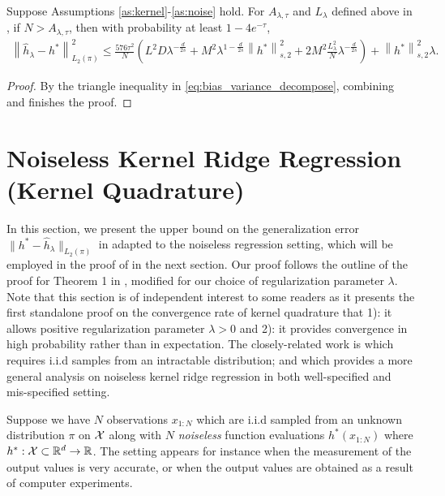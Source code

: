 \begin{prop}\label{prop:krr_all}
Suppose Assumptions \ref{as:kernel}-\ref{as:noise} hold. For $A_{\lambda, \tau}$ and $L_\lambda$ defined above in , if $N > A_{\lambda, \tau}$, then with probability at least $1 - 4e^{-\tau}$,
\begin{align*}
    \left\| \hat{h}_\lambda - h^\ast \right\|_{L_2(\pi)}^2 \leq \frac{576 \tau^2}{N} \left( L^2 D \lambda^{ -\frac{d}{2s} } + M^2 \lambda^{1 - \frac{d}{2s}} \left\| h^\ast \right \|_{s,2}^2  + 2 M^2  \frac{L_\lambda^2}{N} \lambda^{-\frac{d}{2s}} \right) + \left\|h^\ast\right\|_{s,2}^2 \lambda .
\end{align*}
\end{prop}
\begin{proof}
By the triangle inequality in \eqref{eq:bias_variance_decompose}, combining  and  finishes the proof.
\end{proof}

\section{Noiseless Kernel Ridge Regression (Kernel Quadrature)}\label{sec:noiseless_krr}
In this section, we present the upper bound on the generalization error $\| h^\ast - \hat{h}_{\lambda} \|_{L_2(\pi)}$ in  adapted to the noiseless regression setting, which will be employed in the proof of  in the next section.
Our proof follows the outline of the proof for Theorem 1 in \cite{fischer2020sobolev}, modified for our choice of regularization parameter $\lambda$.
Note that this section is of independent interest to some readers as it presents the first standalone proof on the convergence rate of kernel quadrature that 1): it allows positive regularization parameter $\lambda > 0$ and 2): it provides convergence in high probability rather than in expectation.
The closely-related work is \citet{Bach2015} which requires i.i.d samples from an intractable distribution; and
\citet{long2024duality} which provides a more general analysis on noiseless kernel ridge regression in both well-specified and mis-specified setting.

Suppose we have $N$ observations $x_{1:N}$ which are i.i.d sampled from an unknown distribution $\pi$ on $\mathcal{X}$ along with $N$ \emph{noiseless} function evaluations $h^\ast(x_{1:N})$ where $h^\ast : \mathcal{X} \subset \mathbb{R}^d \to \mathbb{R}$. 
The setting appears for instance when the measurement of the output
values is very accurate, or when the output values are obtained as a result of computer experiments. 

